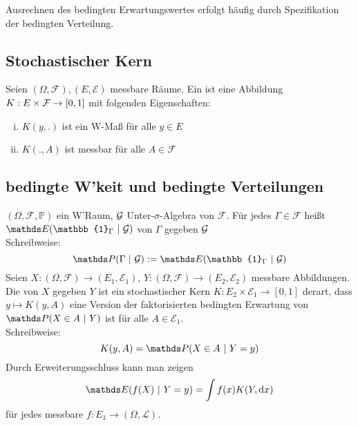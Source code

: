 Ausrechnen des bedingten Erwartungswertes erfolgt häufig durch Spezifikation der bedingten Verteilung.


\subsection{Stochastischer Kern}
\label{sub:stoch_kern}
Seien $(\Omega,\mathcal{F}),(E,\mathcal{E})$ messbare Räume. 
Ein  ist eine Abbildung $K:E\times \mathcal{F} \to [0,1]$ mit folgenden Eigenschaften:
\begin{enumerate}[(i)]
	\item $K(y,.)$ ist ein W-Maß für alle $y\in E$
	\item $K(.,A)$ ist messbar für alle $A\in \mathcal{F}$
\end{enumerate}


\subsection{bedingte W'keit und bedingte Verteilungen}
\label{sub:bed_wk_vert}
$(\Omega,\mathcal{F},\mathds{P})$ ein W'Raum, $\mathcal{G}$ Unter-$\sigma$-Algebra von $\mathcal{F}$. 
Für jedes $\Gamma\in \mathcal{F}$ heißt $\E(\mathbb{1}_\Gamma~|~\G)$  von $\Gamma$ gegeben $\mathcal{G}$\\
Schreibweise: 
\[
\Pw(\Gamma~|~\G):=\E(\mathbb{1}_\Gamma~|~\G) 
\]
Seien $X:(\Omega,\mathcal{F})\to (E_1,\mathcal{E}_1)$, $Y:(\Omega,\mathcal{F})\to (E_2,\mathcal{E}_2)$ messbare Abbildungen.\\
Die  von $X$ gegeben $Y$ ist ein stochastischer Kern $K:E_2\times \mathcal{E}_1\to [0,1]$ derart, dass $y\mapsto K(y,A)$ eine Version der faktorisierten bedingten Erwartung von $\Pw(X\in A~|~Y)$ ist für alle $A\in\mathcal{E}_1$.\\
Schreibweise: 
\[
K(y,A)=\Pw(X\in A~|~Y=y) 
\]
Durch Erweiterungsschluss kann man zeigen 
\[
\E(f(X)~|~Y=y)= \int f(x) K(Y,\dint x) 
\]
für jedes messbare $f:E_1\to(\Omega,\mathcal{L})$.

